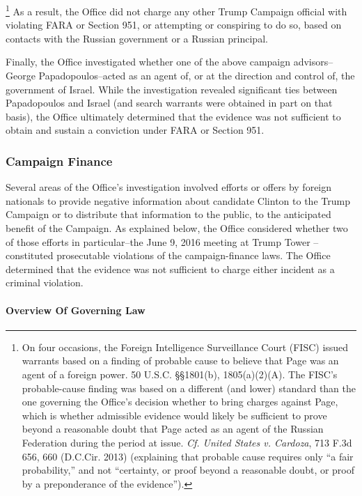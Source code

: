\footnote{On four occasions, the Foreign Intelligence Surveillance Court (FISC) issued warrants based on a finding of probable cause to believe that Page was an agent of a foreign power.
50 U.S.C. \S\S 1801(b), 1805(a)(2)(A).
The FISC's probable-cause finding was based on a different (and lower) standard than the one governing the Office's decision whether to bring charges against Page, which is whether admissible evidence would likely be sufficient to prove beyond a reasonable doubt that Page acted as an agent of the Russian Federation during the period at issue.
\textit{Cf. United States v. Cardoza}, 713 F.3d 656, 660 (D.C.Cir. 2013) (explaining that probable cause requires only “a fair probability,” and not “certainty, or proof beyond a reasonable doubt, or proof by a preponderance of the evidence”).}
As a result, the Office did not charge  any other Trump Campaign official with violating FARA or Section 951, or attempting or conspiring to do so, based on contacts with the Russian government or a Russian principal.

Finally, the Office investigated whether one of the above campaign advisors--George Papadopoulos--acted as an agent of, or at the direction and control of, the government of Israel.
While the investigation revealed significant ties between Papadopoulos and Israel (and search warrants were obtained in part on that basis), the Office ultimately determined that the evidence was not sufficient to obtain and sustain a conviction under FARA or Section 951.

\subsubsection{Campaign Finance}
Several areas of the Office's investigation involved efforts or offers by foreign nationals to provide negative information about candidate Clinton to the Trump Campaign or to distribute that information to the public, to the anticipated benefit of the Campaign.
As explained below, the Office considered whether two of those efforts in particular--the June 9, 2016 meeting at Trump Tower --constituted prosecutable violations of the campaign-finance laws.
The Office determined that the evidence was not sufficient to charge either incident as a criminal violation.

\paragraph{Overview Of Governing Law}

